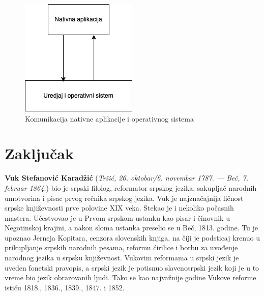 \documentclass[12pt,oneside]{memoir}
\begin{document}
\begin{figure}[h]
    \centering
    \includegraphics[scale=0.5]{docs/images/chapterTwo/nativnaAplikacija.png}
    \caption{Komunikacija nativne aplikacije i operativnog sistema}
    \label{fig:nativnaAplikacija}
\end{figure}

\chapter{Zaključak}
\pangrami

\pangrami

\literatura

\backmatter

\begin{biografija}
  \textbf{Vuk Stefanović Karadžić} (\emph{Tršić,
    26. oktobar/6. novembar 1787. — Beč, 7. februar 1864.}) bio je
  srpski filolog, reformator srpskog jezika, sakupljač narodnih
  umotvorina i pisac prvog rečnika srpskog jezika.  Vuk je
  najznačajnija ličnost srpske književnosti prve polovine XIX
  veka. Stekao je i nekoliko počasnih mastera.  Učestvovao je u
  Prvom srpskom ustanku kao pisar i činovnik u Negotinskoj krajini, a
  nakon sloma ustanka preselio se u Beč, 1813. godine. Tu je upoznao
  Jerneja Kopitara, cenzora slovenskih knjiga, na čiji je podsticaj
  krenuo u prikupljanje srpskih narodnih pesama, reformu ćirilice i
  borbu za uvođenje narodnog jezika u srpsku književnost. Vukovim
  reformama u srpski jezik je uveden fonetski pravopis, a srpski jezik
  je potisnuo slavenosrpski jezik koji je u to vreme bio jezik
  obrazovanih ljudi. Tako se kao najvažnije godine Vukove reforme
  ističu 1818., 1836., 1839., 1847. i 1852.
\end{biografija}
\end{document}
